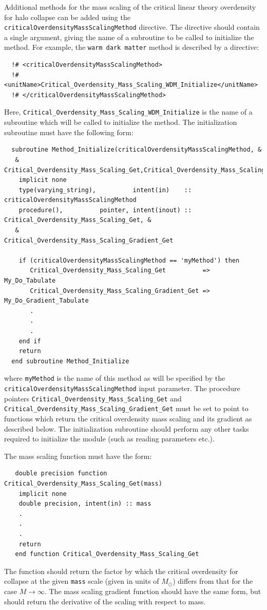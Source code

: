 Additional methods for the mass scaling of the critical linear theory overdensity for halo collapse can be added using the {\tt criticalOverdensityMassScalingMethod} directive. The directive should contain a single argument, giving the name of a subroutine to be called to initialize the method. For example, the {\tt warm dark matter} method is described by a directive:
\begin{verbatim}
  !# <criticalOverdensityMassScalingMethod>
  !#  <unitName>Critical_Overdensity_Mass_Scaling_WDM_Initialize</unitName>
  !# </criticalOverdensityMassScalingMethod>
\end{verbatim}
Here, {\tt Critical\_Overdensity\_Mass\_Scaling\_WDM\_Initialize} is the name of a subroutine which will be called to initialize the method. The initialization subroutine must have the following form:
\begin{verbatim}
  subroutine Method_Initialize(criticalOverdensityMassScalingMethod, &
   & Critical_Overdensity_Mass_Scaling_Get,Critical_Overdensity_Mass_Scaling_Gradient_Get)
    implicit none
    type(varying_string),          intent(in)    :: criticalOverdensityMassScalingMethod
    procedure(),          pointer, intent(inout) :: Critical_Overdensity_Mass_Scaling_Get, &
   &                                                Critical_Overdensity_Mass_Scaling_Gradient_Get
    
    if (criticalOverdensityMassScalingMethod == 'myMethod') then
       Critical_Overdensity_Mass_Scaling_Get          => My_Do_Tabulate
       Critical_Overdensity_Mass_Scaling_Gradient_Get => My_Do_Gradient_Tabulate
       .
       .
       .
    end if
    return
  end subroutine Method_Initialize
\end{verbatim}
where {\tt myMethod} is the name of this method as will be specified by the {\tt criticalOverdensityMassScalingMethod} input parameter. The procedure pointers {\tt Critical\_Overdensity\_Mass\_Scaling\_Get} and {\tt Critical\_Overdensity\_Mass\_Scaling\_Gradient\_Get} must be set to point to functions which return the critical overdensity mass scaling and its gradient as described below. The initialization subroutine should perform any other tasks required to initialize the module (such as reading parameters etc.).

The mass scaling function must have the form:
\begin{verbatim}
   double precision function Critical_Overdensity_Mass_Scaling_Get(mass)
    implicit none
    double precision, intent(in) :: mass
    .
    .
    .
    return
   end function Critical_Overdensity_Mass_Scaling_Get
\end{verbatim}
The function should return the factor by which the critical overdensity for collapse at the given {\tt mass} scale (given in units of $M_{\odot}$) differs from that for the case $M\rightarrow\infty$. The mass scaling gradient function should have the same form, but should return the derivative of the scaling with respect to mass.


